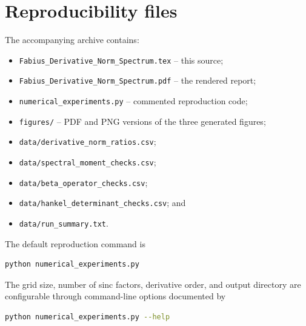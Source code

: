 \documentclass[11pt,oneside]{article}
\theoremstyle{definition}
\theoremstyle{remark}
\begin{document}
\section{Reproducibility files}
\label{p4:app:reproducibility}

The accompanying archive contains:
\begin{itemize}
\item \texttt{Fabius\_Derivative\_Norm\_Spectrum.tex} -- this source;
\item \texttt{Fabius\_Derivative\_Norm\_Spectrum.pdf} -- the rendered report;
\item \texttt{numerical\_experiments.py} -- commented reproduction code;
\item \texttt{figures/} -- PDF and PNG versions of the three generated figures;
\item \texttt{data/derivative\_norm\_ratios.csv};
\item \texttt{data/spectral\_moment\_checks.csv};
\item \texttt{data/beta\_operator\_checks.csv};
\item \texttt{data/hankel\_determinant\_checks.csv}; and
\item \texttt{data/run\_summary.txt}.
\end{itemize}

The default reproduction command is
\begin{lstlisting}[style=code,language=bash]
python numerical_experiments.py
\end{lstlisting}
The grid size, number of sinc factors, derivative order, and output directory are configurable
through command-line options documented by
\begin{lstlisting}[style=code,language=bash]
python numerical_experiments.py --help
\end{lstlisting}
\end{document}
